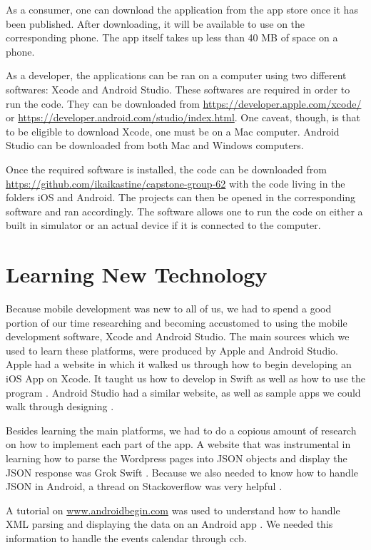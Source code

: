 \documentclass[letterpaper,10pt,draftclsnofoot,onecolumn,titlepage]{IEEEtran}
\begin{document}
As a consumer, one can download the application from the app store once it has been published. 
After downloading, it will be available to use on the corresponding phone. 
The app itself takes up less than 40 MB of space on a phone. 

As a developer, the applications can be ran on a computer using two different softwares: Xcode and Android Studio. 
These softwares are required in order to run the code.
They can be downloaded from \url{https://developer.apple.com/xcode/} or \url{https://developer.android.com/studio/index.html}. 
One caveat, though, is that to be eligible to download Xcode, one must be on a Mac computer. 
Android Studio can be downloaded from both Mac and Windows computers. 

Once the required software is installed, the code can be downloaded from \url{https://github.com/ikaikastine/capstone-group-62} with the code living in the folders iOS and Android. 
The projects can then be opened in the corresponding software and ran accordingly. 
The software allows one to run the code on either a built in simulator or an actual device if it is connected to the computer. 



\section{Learning New Technology}
Because mobile development was new to all of us, we had to spend a good portion of our time researching and becoming accustomed to using the mobile development software, Xcode and Android Studio.
The main sources which we used to learn these platforms, were produced by Apple and Android Studio. 
Apple had a website in which it walked us through how to begin developing an iOS App on Xcode. 
It taught us how to develop in Swift as well as how to use the program \cite{AppleSwift}.
Android Studio had a similar website, as well as sample apps we could walk through designing \cite{AndroidStudio}. 

Besides learning the main platforms, we had to do a copious amount of research on how to implement each part of the app. 
A website that was instrumental in learning how to parse the Wordpress pages into JSON objects and display the JSON response was Grok Swift \cite{JSONSwift}. Because we also needed to know how to handle JSON in Android, a thread on Stackoverflow was very helpful \cite{JSONAndroid}. 

A tutorial on \url{www.androidbegin.com} was used to understand how to handle XML parsing and displaying the data on an Android app \cite{XMLAndroid}. 
We needed this information to handle the events calendar through \gls{ccb}. 
\end{document}
